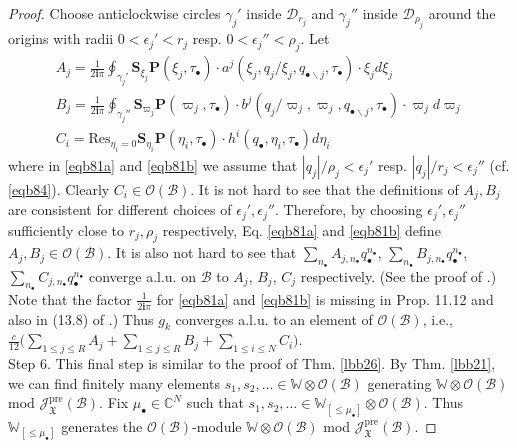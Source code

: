 \documentclass[11pt,b5paper,notitlepage]{article}
\theoremstyle{definition}
\theoremstyle{plain}
\newcommand{\Res}{\mathrm{Res}}
\newcommand{\im}{\mathbf{i}}
\newcommand{\mbf}{\mathbf}
\newcommand{\blt}{\bullet}
\newcommand{\Wbb}{\mathbb W}
\newcommand{\Cbb}{\mathbb C}
\newcommand{\Sbf}{\mathbf{S}}
\newcommand{\<}{\left\langle}
\renewcommand{\>}{\right\rangle}
\newcommand{\MO}{\mathcal{O}}
\newcommand{\MB}{\mathcal{B}}
\newcommand{\fx}{\mathfrak{X}}
\newcommand{\SJ}{\mathscr{J}}
\newcommand{\MD}{\mathcal{D}}
\newcommand{\pre}{\mathrm{pre}}
\numberwithin{equation}{subsection}
\begin{document}
\begin{proof}
Choose anticlockwise circles $\gamma_j'$ inside $\MD_{r_j}$ and $\gamma_j''$ inside $\MD_{\rho_j}$ around the origins with radii $0<\epsilon_j'<r_j$ resp. $0<\epsilon_j''<\rho_j$. Let
\begin{subequations}\label{eqb81}
\begin{gather}
    \label{eqb81a}A_j=\frac{1}{2\im\pi}\oint\nolimits_{\gamma_j'} \Sbf_{\xi_j}\mbf P(\xi_j,\tau_\blt)\cdot a^j(\xi_j,q_j/\xi_j,q_{\blt\backslash j},\tau_\blt) \cdot \xi_j d\xi_j\\
    \label{eqb81b}B_j=\frac{1}{2\im\pi}\oint\nolimits_{\gamma_j''} \Sbf_{\varpi_j}\mbf P(\varpi_j,\tau_\blt)\cdot b^j(q_j/\varpi_j,\varpi_j,q_{\blt\backslash j},\tau_\blt)\cdot \varpi_j d\varpi_j\\
    \label{eqb81c}C_i=\Res_{\eta_i=0} \Sbf_{\eta_i} \mbf P(\eta_i,\tau_\blt)\cdot h^i(q_\blt,\eta_i,\tau_\blt)d\eta_i
\end{gather} 
\end{subequations}
where in \eqref{eqb81a} and \eqref{eqb81b} we assume that $|q_j|/\rho_j<\epsilon_j'$ resp. $|q_j|/r_j<\epsilon_j''$ (cf. \eqref{eqb84}). Clearly $C_i\in\MO(\MB)$. It is not hard to see that the definitions of $A_j,B_j$ are consistent for different choices of $\epsilon_j',\epsilon_j''$. Therefore, by choosing $\epsilon_j',\epsilon_j''$ sufficiently close to $r_j,\rho_j$ respectively, Eq. \eqref{eqb81a} and \eqref{eqb81b} define $A_j,B_j\in\MO(\MB)$. It is also not hard to see that $\sum_{n_\blt} A_{j,n_\blt}q_\blt^{n_\blt}$, $\sum_{n_\blt} B_{j,n_\blt}q_\blt^{n_\blt}$, $\sum_{n_\blt} C_{j,n_\blt}q_\blt^{n_\blt}$ converge a.l.u. on $\MB$ to $A_j$, $B_j$, $C_j$ respectively. (See the proof of \cite[Prop. 11.12]{Gui-sewingconvergence}.) Note that the factor $\frac 1{2\im\pi}$ for \eqref{eqb81a} and \eqref{eqb81b} is missing in Prop. 11.12 and also in (13.8) of \cite{Gui-sewingconvergence}.) Thus $g_k$ converges a.l.u. to an element of $\MO(\MB)$, i.e., $\frac{c}{12}\Big(\sum_{1\leq j\leq R} A_j+\sum_{1\leq j\leq R} B_j+\sum_{1\leq i\leq N}C_i\Big)$.\\[-1ex]




Step 6. This final step is similar to the proof of Thm. \ref{lbb26}. By Thm. \ref{lbb21}, we can find finitely many elements $s_1,s_2,\dots\in\Wbb\otimes\MO(\MB)$ generating $\Wbb\otimes\MO(\MB)$ mod $\SJ^\pre_\fx(\MB)$. Fix $\mu_\blt\in\Cbb^N$ such that $s_1,s_2,\dots\in\Wbb_{[\leq\mu_\blt]}\otimes\MO(\MB)$. Thus $\Wbb_{[\leq\mu_\blt]}$ generates the $\MO(\MB)$-module $\Wbb\otimes\MO(\MB)$ mod $\SJ^\pre_\fx(\MB)$.



\end{proof}
\end{document}
